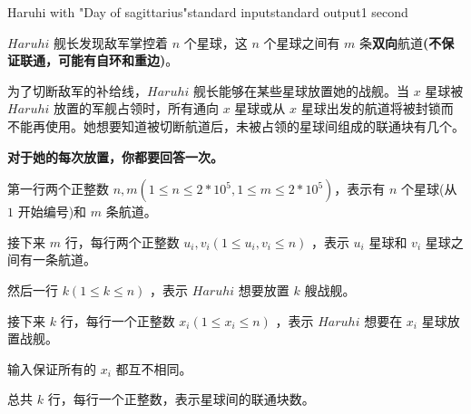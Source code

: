 \begin{problem}{Haruhi with "Day of sagittarius"}{standard input}{standard output}{1 second}

$Haruhi$ 舰长发现敌军掌控着 $n$ 个星球，这 $n$ 个星球之间有 $m$ 条\textbf{双向}航道\textbf{(不保证联通，可能有自环和重边)}。

为了切断敌军的补给线，$Haruhi$ 舰长能够在某些星球放置她的战舰。当 $x$ 星球被 $Haruhi$ 放置的军舰占领时，所有通向 $x$ 星球或从 $x$ 星球出发的航道将被封锁而不能再使用。她想要知道被切断航道后，未被占领的星球间组成的联通块有几个。

\textbf{对于她的每次放置，你都要回答一次。}	

\InputFile

第一行两个正整数 $n,m(1 \leq n \leq 2*10^5,1 \leq m \leq 2*10^5)$，表示有 $n$ 个星球(从 $1$ 开始编号)和 $m$ 条航道。

接下来 $m$ 行，每行两个正整数 $u_i,v_i(1 \leq u_i,v_i \leq n)$ ，表示 $u_i$  星球和 $v_i$ 星球之间有一条航道。

然后一行 $k(1 \leq k \leq n)$ ，表示 $Haruhi$ 想要放置 $k$ 艘战舰。

接下来 $k$ 行，每行一个正整数 $x_i(1 \leq x_i \leq n)$ ，表示 $Haruhi$ 想要在 $x_i$ 星球放置战舰。

输入保证所有的 $x_i$ 都互不相同。

\OutputFile

总共 $k$ 行，每行一个正整数，表示星球间的联通块数。

\Example
\begin{example}
%
\end{example}
\end{problem}
